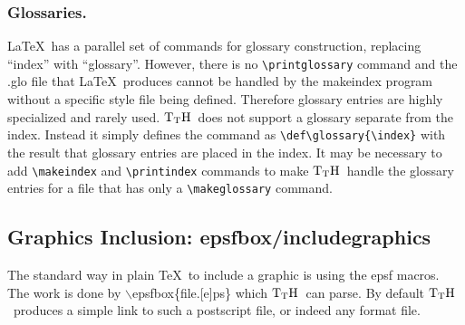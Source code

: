 \documentclass[12pt]{article}
\def\TtH{$\rm{}T_TH$}
\begin{document}
\subsubsection{Glossaries.} \LaTeX\ has a parallel set of commands for
glossary construction, replacing ``index'' with ``glossary''.
However, there is no \verb+\printglossary+ command and the .glo file
that \LaTeX\ produces cannot be handled by the makeindex program
without a specific style file being defined. Therefore glossary
entries are highly specialized and rarely used. \TtH\ does not support
a glossary separate from the index. Instead it simply defines the
command as \verb+\def\glossary{\index}+ with the result that glossary
entries are placed in the index. It may be necessary to add
\verb+\makeindex+ and \verb+\printindex+ commands to make \TtH\ handle
the glossary entries for a file that has only a \verb+\makeglossary+
command.

\subsection{Graphics Inclusion: epsfbox/includegraphics}
\label{epsf}
The standard way in plain \TeX\ to include a graphic is using the epsf
macros. The work is done by $\backslash$epsfbox\{file.[e]ps\} which
\TtH\ can parse. By default \TtH\ produces a simple link to such a
postscript file, or indeed any format file.
\end{document}
